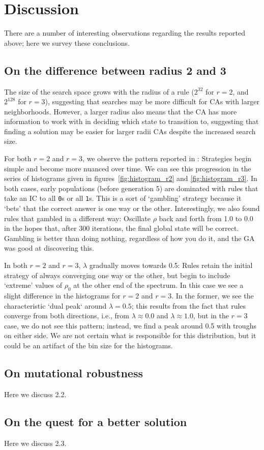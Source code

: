 \section{Discussion} \label{discussion}

There are a number of interesting observations regarding the results reported above; here we survey these 
conclusions.

\subsection{On the difference between radius 2 and 3}

The size of the search space grows with the radius of a rule ($2^{32}$ for $r = 2$, and $2^{128}$ for $r = 3$), suggesting 
that searches may be more difficult for CAs with larger neighborhoods. However, a larger radius also means that the CA has more information 
to work with in deciding which state to transition to, suggesting that finding a solution may be easier for larger radii CAs despite the increased 
search size.

For both $r = 2$ and $r = 3$, we observe the pattern reported in \cite{Mitchell:1994:ECA:186092.186116}: Strategies begin simple and become 
more nuanced over time. We can see this progression in the series of histograms given in figures~\ref{fig:histogram_r2} 
and \ref{fig:histogram_r3}. In both cases, early populations (before generation 5) are dominated with rules that take an IC to all \texttt{0}s or 
all \texttt{1}s. This is a sort of `gambling' strategy because it `bets' that the correct answer 
is one way or the other. Interestingly, we also found rules that gambled in a different way: Oscillate $\rho$ back and forth from 1.0 to 0.0 in the hopes 
that, after 300 iterations, the final global state will be correct. Gambling is better than doing nothing, regardless of how you do it, and the GA 
was good at discovering this.

In both $r = 2$ and $r = 3$, $\lambda$ gradually moves towards 0.5: Rules retain the initial strategy of always converging one way or the other, but begin to include `extreme' values of $\rho_0$ at the other end of the spectrum. In this case we see a slight difference in the histograms for $r = 2$ and 
$r = 3$. In the former, we see the characteristic `dual peak` around $\lambda = 0.5$; this results from the fact that rules converge from both directions, 
i.e., from $\lambda \approx 0.0$ and $\lambda \approx 1.0$, but in the $r = 3$ case, we do not see this pattern; instead, we find a peak around 0.5 
with troughs on either side. We are not certain what is responsible for this distribution, but it could be an artifact of the bin size for the histograms.


\subsection{On mutational robustness}

Here we discuss 2.2.

\subsection{On the quest for a better solution}

Here we discuss 2.3.



